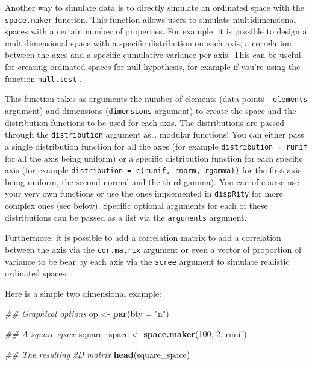 \documentclass[
]{book}
\newenvironment{Shaded}{\begin{snugshade}}{\end{snugshade}}
\newcommand{\CommentTok}[1]{\textcolor[rgb]{0.56,0.35,0.01}{\textit{#1}}}
\newcommand{\DataTypeTok}[1]{\textcolor[rgb]{0.13,0.29,0.53}{#1}}
\newcommand{\DecValTok}[1]{\textcolor[rgb]{0.00,0.00,0.81}{#1}}
\newcommand{\KeywordTok}[1]{\textcolor[rgb]{0.13,0.29,0.53}{\textbf{#1}}}
\newcommand{\NormalTok}[1]{#1}
\newcommand{\StringTok}[1]{\textcolor[rgb]{0.31,0.60,0.02}{#1}}
\begin{document}
Another way to simulate data is to directly simulate an ordinated space with the \texttt{space.maker} function.
This function allows users to simulate multidimensional spaces with a certain number of properties.
For example, it is possible to design a multidimensional space with a specific distribution on each axis, a correlation between the axes and a specific cumulative variance per axis.
This can be useful for creating ordinated spaces for null hypothesis, for example if you're using the function \texttt{null.test} \citep{diaz2016global}.

This function takes as arguments the number of elements (data points - \texttt{elements} argument) and dimensions (\texttt{dimensions} argument) to create the space and the distribution functions to be used for each axis.
The distributions are passed through the \texttt{distribution} argument as\ldots{} modular functions!
You can either pass a single distribution function for all the axes (for example \texttt{distribution\ =\ runif} for all the axis being uniform) or a specific distribution function for each specific axis (for example \texttt{distribution\ =\ c(runif,\ rnorm,\ rgamma))} for the first axis being uniform, the second normal and the third gamma).
You can of course use your very own functions or use the ones implemented in \texttt{dispRity} for more complex ones (see below).
Specific optional arguments for each of these distributions can be passed as a list via the \texttt{arguments} argument.

Furthermore, it is possible to add a correlation matrix to add a correlation between the axis via the \texttt{cor.matrix} argument or even a vector of proportion of variance to be bear by each axis via the \texttt{scree} argument to simulate realistic ordinated spaces.

Here is a simple two dimensional example:

\begin{Shaded}
\begin{Highlighting}[]
\CommentTok{\#\# Graphical options}
\NormalTok{op \textless{}{-}}\StringTok{ }\KeywordTok{par}\NormalTok{(}\DataTypeTok{bty =} \StringTok{"n"}\NormalTok{)}

\CommentTok{\#\# A square space}
\NormalTok{square\_space \textless{}{-}}\StringTok{ }\KeywordTok{space.maker}\NormalTok{(}\DecValTok{100}\NormalTok{, }\DecValTok{2}\NormalTok{, runif)}

\CommentTok{\#\# The resulting 2D matrix}
\KeywordTok{head}\NormalTok{(square\_space)}
\end{Highlighting}
\end{Shaded}
\end{document}
